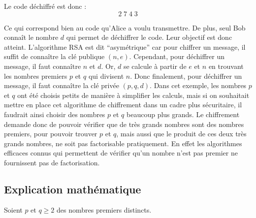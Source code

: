   Le code déchiffré est donc :
  \[2 \; 7 \; 4 \; 3\]
  
  Ce qui correspond bien au code qu'Alice a voulu transmettre. De plus, seul Bob connaît le nombre $d$ qui permet de déchiffrer le code. Leur objectif est donc atteint.
  \newpar
  L'algorithme RSA est dit ``asymétrique'' car pour chiffrer un message, il suffit de connaître la clé publique $(n, e)$. Cependant, pour déchiffrer un message, il faut connaître $n$ et $d$. Or, $d$ se calcule à partir de $e$ et $n$ en trouvant les nombres premiers $p$ et $q$ qui divisent $n$. Donc finalement, pour déchiffrer un message, il faut connaître la clé privée $(p, q, d)$.
  \newpar
  Dans cet exemple, les nombres $p$ et $q$ ont été choisis petits de manière à simplifier les calculs, mais si on souhaitait mettre en place cet algorithme de chiffrement dans un cadre plus sécuritaire, il faudrait ainsi choisir des nombres $p$ et $q$ beaucoup plus grands.
  \newpar
  Le chiffrement demande donc de pouvoir vérifier que de très grands nombres sont des nombres premiers, pour pouvoir trouver $p$ et $q$, mais aussi que le produit de ces deux très grands nombres, ne soit pas factorisable pratiquement. En effet les algorithmes efficaces connus qui permettent de vérifier qu'un nombre n'est pas premier ne fournissent pas de factorisation.
  
  \begin{center}
  \end{center}
  
  \subsection{Explication mathématique}
  
  Soient $p$ et $q \geq 2$ des nombres premiers distincts.
  
